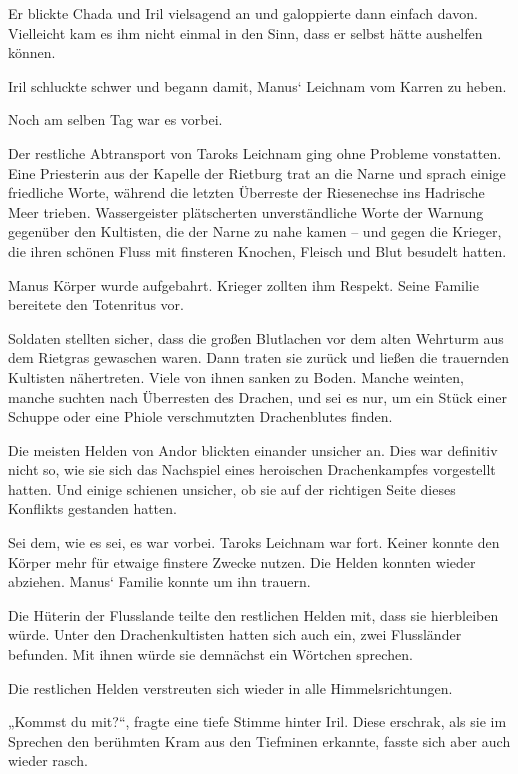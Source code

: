 Er blickte Chada und Iril vielsagend an und galoppierte dann einfach davon. Vielleicht kam es ihm nicht einmal in den Sinn, dass er selbst hätte aushelfen können.

Iril schluckte schwer und begann damit, Manus‘ Leichnam vom Karren zu heben.\bigskip







Noch am selben Tag war es vorbei.

Der restliche Abtransport von Taroks Leichnam ging ohne Probleme vonstatten. Eine Priesterin aus der Kapelle der Rietburg trat an die Narne und sprach einige friedliche Worte, während die letzten Überreste der Riesenechse ins Hadrische Meer trieben. Wassergeister plätscherten unverständliche Worte der Warnung gegenüber den Kultisten, die der Narne zu nahe kamen – und gegen die Krieger, die ihren schönen Fluss mit finsteren Knochen, Fleisch und Blut besudelt hatten.

Manus Körper wurde aufgebahrt. Krieger zollten ihm Respekt. Seine Familie bereitete den Totenritus vor.

Soldaten stellten sicher, dass die großen Blutlachen vor dem alten Wehrturm aus dem Rietgras gewaschen waren. Dann traten sie zurück und ließen die trauernden Kultisten nähertreten. Viele von ihnen sanken zu Boden. Manche weinten, manche suchten nach Überresten des Drachen, und sei es nur, um ein Stück einer Schuppe oder eine Phiole verschmutzten Drachenblutes finden.

Die meisten Helden von Andor blickten einander unsicher an. Dies war definitiv nicht so, wie sie sich das Nachspiel eines heroischen Drachenkampfes vorgestellt hatten. Und einige schienen unsicher, ob sie auf der richtigen Seite dieses Konflikts gestanden hatten.

Sei dem, wie es sei, es war vorbei. Taroks Leichnam war fort. Keiner konnte den Körper mehr für etwaige finstere Zwecke nutzen. Die Helden konnten wieder abziehen. Manus‘ Familie konnte um ihn trauern.

Die Hüterin der Flusslande teilte den restlichen Helden mit, dass sie hierbleiben würde. Unter den Drachenkultisten hatten sich auch ein, zwei Flussländer befunden. Mit ihnen würde sie demnächst ein Wörtchen sprechen.

Die restlichen Helden verstreuten sich wieder in alle Himmelsrichtungen.

„Kommst du mit?“, fragte eine tiefe Stimme hinter Iril. Diese erschrak, als sie im Sprechen den berühmten Kram aus den Tiefminen erkannte, fasste sich aber auch wieder rasch.

